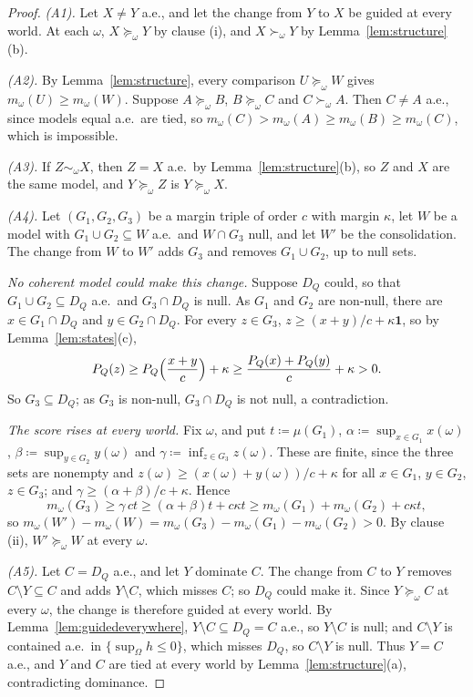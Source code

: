 \documentclass[11pt]{article}
\newcommand{\one}{\mathbf{1}}
\theoremstyle{plain}
\theoremstyle{definition}
\theoremstyle{remark}
\begin{document}
\begin{proof}
\emph{(A1).} Let $X\ne Y$ a.e., and let the change from $Y$ to $X$ be guided at every world. At
each $\omega$, $X\succeq_\omega Y$ by clause (i), and $X\succ_\omega Y$ by
Lemma~\ref{lem:structure}(b).

\emph{(A2).} By Lemma~\ref{lem:structure}, every comparison $U\succeq_\omega W$ gives
$m_\omega(U)\ge m_\omega(W)$. Suppose $A\succeq_\omega B$, $B\succeq_\omega C$ and $C\succ_\omega
A$. Then $C\ne A$ a.e., since models equal a.e.\ are tied, so $m_\omega(C)>m_\omega(A)\ge
m_\omega(B)\ge m_\omega(C)$, which is impossible.

\emph{(A3).} If $Z\sim_\omega X$, then $Z=X$ a.e.\ by Lemma~\ref{lem:structure}(b), so $Z$ and
$X$ are the same model, and $Y\succeq_\omega Z$ is $Y\succeq_\omega X$.

\emph{(A4).} Let $(G_1,G_2,G_3)$ be a margin triple of order $c$ with margin $\kappa$, let $W$
be a model with $G_1\cup G_2\subseteq W$ a.e.\ and $W\cap G_3$ null, and let $W'$ be the
consolidation. The change from $W$ to $W'$ adds $G_3$ and removes $G_1\cup G_2$, up to null
sets.

\emph{No coherent model could make this change.} Suppose $D_Q$ could, so that $G_1\cup G_2
\subseteq D_Q$ a.e.\ and $G_3\cap D_Q$ is null. As $G_1$ and $G_2$ are non-null, there are
$x\in G_1\cap D_Q$ and $y\in G_2\cap D_Q$. For every $z\in G_3$, $z\ge(x+y)/c+\kappa\one$, so
by Lemma~\ref{lem:states}(c),
\[
  P_Q(z)\ge P_Q\Bigl(\frac{x+y}c\Bigr)+\kappa\ge\frac{P_Q(x)+P_Q(y)}c+\kappa>0 .
\]
So $G_3\subseteq D_Q$; as $G_3$ is non-null, $G_3\cap D_Q$ is not null, a contradiction.

\emph{The score rises at every world.} Fix $\omega$, and put $t\coloneqq\mu(G_1)$,
$\alpha\coloneqq\sup_{x\in G_1}x(\omega)$, $\beta\coloneqq\sup_{y\in G_2}y(\omega)$ and
$\gamma\coloneqq\inf_{z\in G_3}z(\omega)$. These are finite, since the three sets are nonempty
and $z(\omega)\ge(x(\omega)+y(\omega))/c+\kappa$ for all $x\in G_1$, $y\in G_2$, $z\in G_3$; and
$\gamma\ge(\alpha+\beta)/c+\kappa$. Hence
\[
  m_\omega(G_3)\ge\gamma\,ct\ge(\alpha+\beta)t+c\kappa t\ge m_\omega(G_1)+m_\omega(G_2)+c\kappa t,
\]
so $m_\omega(W')-m_\omega(W)=m_\omega(G_3)-m_\omega(G_1)-m_\omega(G_2)>0$. By clause (ii),
$W'\succeq_\omega W$ at every $\omega$.

\emph{(A5).} Let $C=D_Q$ a.e., and let $Y$ dominate $C$. The change from $C$ to $Y$ removes
$C\setminus Y\subseteq C$ and adds $Y\setminus C$, which misses $C$; so $D_Q$ could make it.
Since $Y\succeq_\omega C$ at every $\omega$, the change is therefore guided at every world. By
Lemma~\ref{lem:guidedeverywhere}, $Y\setminus C\subseteq D_Q=C$ a.e., so $Y\setminus C$ is null;
and $C\setminus Y$ is contained a.e.\ in $\{\sup_\Omega h\le0\}$, which misses $D_Q$, so
$C\setminus Y$ is null. Thus $Y=C$ a.e., and $Y$ and $C$ are tied at every world by
Lemma~\ref{lem:structure}(a), contradicting dominance.
\end{proof}
\end{document}
